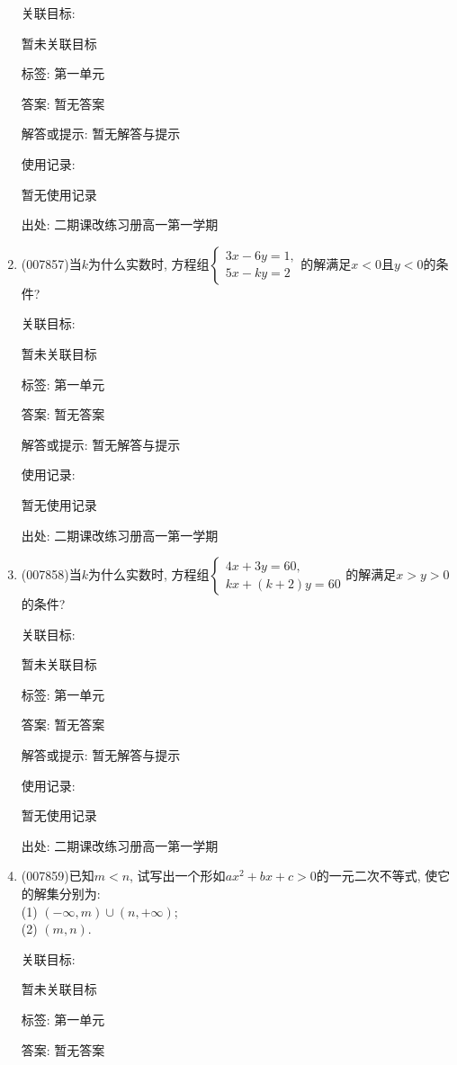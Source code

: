 \documentclass[10pt,a4paper]{article}
\begin{document}
\begin{enumerate}[1.]
关联目标:

暂未关联目标



标签: 第一单元

答案: 暂无答案

解答或提示: 暂无解答与提示

使用记录:

暂无使用记录


出处: 二期课改练习册高一第一学期
\item { (007857)}当$k$为什么实数时, 方程组$\begin{cases} 3x-6y=1, \\ 5x-ky=2 \end{cases}$的解满足$x<0$且$y<0$的条件?


关联目标:

暂未关联目标



标签: 第一单元

答案: 暂无答案

解答或提示: 暂无解答与提示

使用记录:

暂无使用记录


出处: 二期课改练习册高一第一学期
\item { (007858)}当$k$为什么实数时, 方程组$\begin{cases} 4x+3y=60, \\ kx+(k+2)y=60 \end{cases}$的解满足$x>y>0$的条件?


关联目标:

暂未关联目标



标签: 第一单元

答案: 暂无答案

解答或提示: 暂无解答与提示

使用记录:

暂无使用记录


出处: 二期课改练习册高一第一学期
\item { (007859)}已知$m<n$, 试写出一个形如$ax^2+bx+c>0$的一元二次不等式, 使它的解集分别为:\\
(1) $(-\infty ,m)\cup (n,+\infty)$;\\
(2) $(m,n)$.


关联目标:

暂未关联目标



标签: 第一单元

答案: 暂无答案


\end{enumerate}
\end{document}
